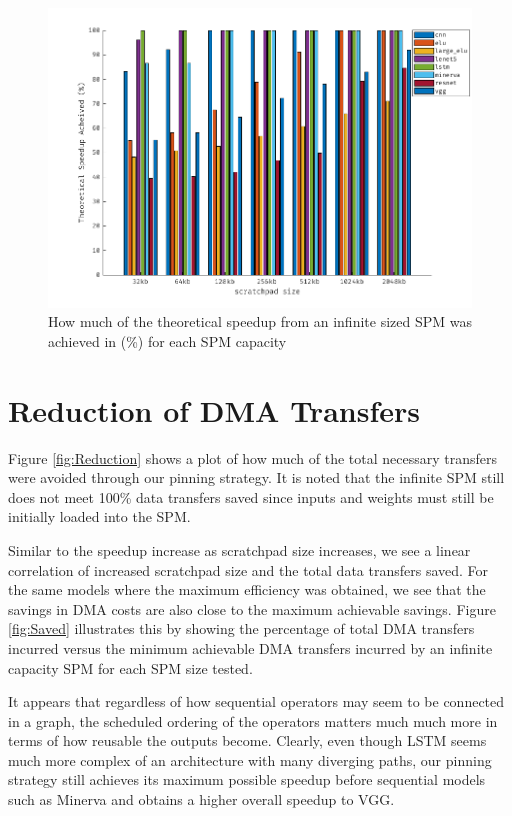 \begin{figure}[!htb]
\centering
\includegraphics[scale=0.7]{Figures/max_acheived.png}
\decoRule
\caption[Percentage of Max Speedup Obtained]{How much of the theoretical speedup from an infinite sized SPM was achieved in (\%) for each SPM capacity}
\label{fig:max}
\end{figure}


\section{Reduction of DMA Transfers}

Figure \ref{fig:Reduction} shows a plot of how much of the total necessary
transfers were avoided through our pinning strategy. It is noted that the
infinite SPM still does not meet 100\% data transfers saved since inputs and
weights must still be initially loaded into the SPM.

Similar to the speedup increase as scratchpad size increases, we see a linear
correlation of increased scratchpad size and the total data transfers saved.
For the same models where the maximum efficiency was obtained, we see that the
savings in DMA costs are also close to the maximum achievable savings. Figure
\ref{fig:Saved} illustrates this by showing the percentage of total DMA
transfers incurred versus the minimum achievable DMA transfers incurred by an
infinite capacity SPM for each SPM size tested.

It appears that regardless of how sequential operators may seem to be connected
in a graph, the scheduled ordering of the operators matters much much more in
terms of how reusable the outputs become. Clearly, even though LSTM seems much
more complex of an architecture with many diverging paths, our pinning strategy
still achieves its maximum possible speedup before sequential models such as
Minerva and obtains a higher overall speedup to VGG.

